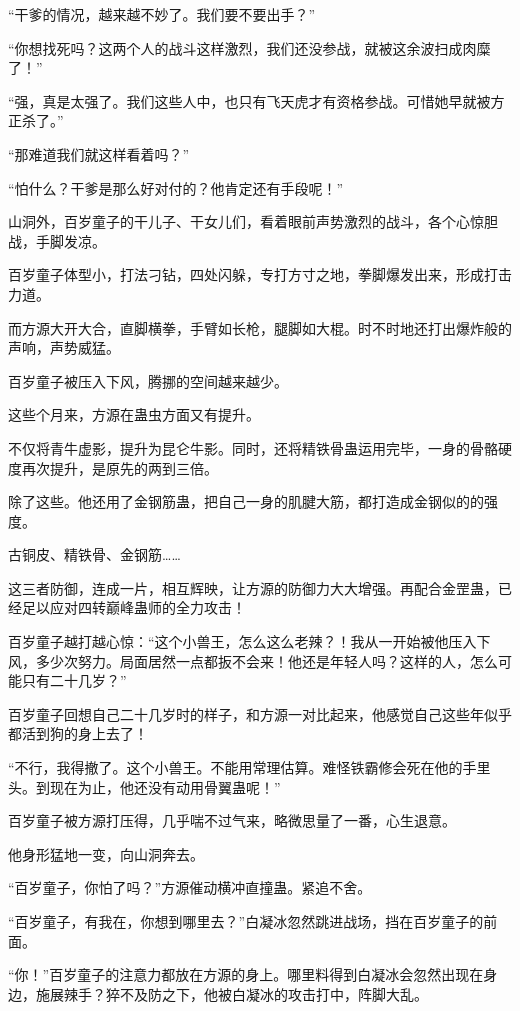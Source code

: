 \begin{this_body}
“干爹的情况，越来越不妙了。我们要不要出手？”

“你想找死吗？这两个人的战斗这样激烈，我们还没参战，就被这余波扫成肉糜了！”

“强，真是太强了。我们这些人中，也只有飞天虎才有资格参战。可惜她早就被方正杀了。”

“那难道我们就这样看着吗？”

“怕什么？干爹是那么好对付的？他肯定还有手段呢！”

山洞外，百岁童子的干儿子、干女儿们，看着眼前声势激烈的战斗，各个心惊胆战，手脚发凉。

百岁童子体型小，打法刁钻，四处闪躲，专打方寸之地，拳脚爆发出来，形成打击力道。

而方源大开大合，直脚横拳，手臂如长枪，腿脚如大棍。时不时地还打出爆炸般的声响，声势威猛。

百岁童子被压入下风，腾挪的空间越来越少。

这些个月来，方源在蛊虫方面又有提升。

不仅将青牛虚影，提升为昆仑牛影。同时，还将精铁骨蛊运用完毕，一身的骨骼硬度再次提升，是原先的两到三倍。

除了这些。他还用了金钢筋蛊，把自己一身的肌腱大筋，都打造成金钢似的的强度。

古铜皮、精铁骨、金钢筋……

这三者防御，连成一片，相互辉映，让方源的防御力大大增强。再配合金罡蛊，已经足以应对四转巅峰蛊师的全力攻击！

百岁童子越打越心惊：“这个小兽王，怎么这么老辣？！我从一开始被他压入下风，多少次努力。局面居然一点都扳不会来！他还是年轻人吗？这样的人，怎么可能只有二十几岁？”

百岁童子回想自己二十几岁时的样子，和方源一对比起来，他感觉自己这些年似乎都活到狗的身上去了！

“不行，我得撤了。这个小兽王。不能用常理估算。难怪铁霸修会死在他的手里头。到现在为止，他还没有动用骨翼蛊呢！”

百岁童子被方源打压得，几乎喘不过气来，略微思量了一番，心生退意。

他身形猛地一变，向山洞奔去。

“百岁童子，你怕了吗？”方源催动横冲直撞蛊。紧追不舍。

“百岁童子，有我在，你想到哪里去？”白凝冰忽然跳进战场，挡在百岁童子的前面。

“你！”百岁童子的注意力都放在方源的身上。哪里料得到白凝冰会忽然出现在身边，施展辣手？猝不及防之下，他被白凝冰的攻击打中，阵脚大乱。


\end{this_body}
